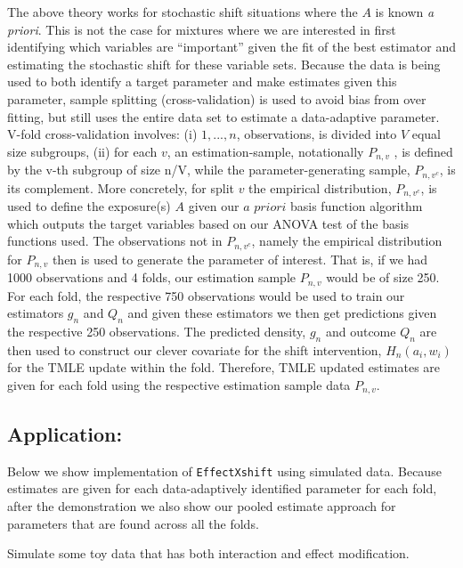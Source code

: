 \documentclass[
]{article}
\begin{document}
The above theory works for stochastic shift situations where the \(A\)
is known \textit{a priori}. This is not the case for mixtures where we
are interested in first identifying which variables are ``important''
given the fit of the best estimator and estimating the stochastic shift
for these variable sets. Because the data is being used to both identify
a target parameter and make estimates given this parameter, sample
splitting (cross-validation) is used to avoid bias from over fitting,
but still uses the entire data set to estimate a data-adaptive
parameter. V-fold cross-validation involves: (i) \({1,..., n}\),
observations, is divided into \(V\) equal size subgroups, (ii) for each
\(v\), an estimation-sample, notationally \(P_{n,v}\) , is defined by
the v-th subgroup of size n/V, while the parameter-generating sample,
\(P_{n,v^c}\), is its complement. More concretely, for split \(v\) the
empirical distribution, \(P_{n,v^c}\), is used to define the exposure(s)
\(A\) given our \(\textit{a priori}\) basis function algorithm which
outputs the target variables based on our ANOVA test of the basis
functions used. The observations not in \(P_{n,v^c}\), namely the
empirical distribution for \(P_{n,v}\) then is used to generate the
parameter of interest. That is, if we had 1000 observations and 4 folds,
our estimation sample \(P_{n,v}\) would be of size 250. For each fold,
the respective 750 observations would be used to train our estimators
\(g_n\) and \(Q_n\) and given these estimators we then get predictions
given the respective 250 observations. The predicted density, \(g_n\)
and outcome \(Q_n\) are then used to construct our clever covariate for
the shift intervention, \(H_n(a_i, w_i)\) for the TMLE update within the
fold. Therefore, TMLE updated estimates are given for each fold using
the respective estimation sample data \(P_{n,v}\).

\hypertarget{application}{%
\subsection{Application:}\label{application}}

Below we show implementation of \texttt{EffectXshift} using simulated data.
Because estimates are given for each data-adaptively identified
parameter for each fold, after the demonstration we also show our pooled
estimate approach for parameters that are found across all the folds.

Simulate some toy data that has both interaction and effect
modification.
\end{document}
